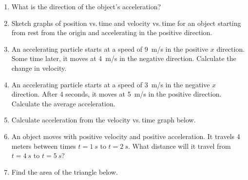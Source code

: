 \documentclass[dvipsnames]{article}
\begin{document}
\begin{enumerate}[itemsep=0pt,topsep=-3pt]
\item What is the direction of the object's acceleration?
\begin{center}
\end{center}

\item Sketch graphs of position vs.\,time and velocity vs.\,time for an object starting from rest from the origin and accelerating in the positive direction.

\item An accelerating particle starts at a speed of \SI{9}{m/s} in the positive $x$ direction. Some time later, it moves at \SI{4}{m/s} in the negative direction. Calculate the change in velocity.

\item An accelerating particle starts at a speed of \SI{3}{m/s} in the negative $x$ direction. After 4 seconds, it moves at \SI{5}{m/s} in the positive direction. Calculate the average acceleration.

\item Calculate acceleration from the velocity vs.\,time graph below.
\begin{center}
\end{center}

\item An object moves with positive velocity and positive acceleration. It travels 4 meters between times $t = \SI{1}{s}$ to $t = \SI{2}{s}$. What distance will it travel from $t = \SI{4}{s}$ to $t = \SI{5}{s}$?

\item Find the area of the triangle below.


\end{enumerate}
\end{document}
